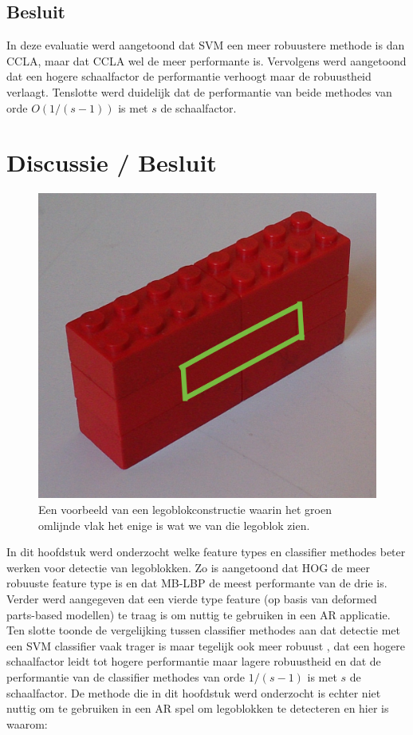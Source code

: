 \subsection{Besluit}
In deze evaluatie werd aangetoond dat SVM een meer robuustere methode is dan CCLA, maar dat CCLA wel de meer performante is. Vervolgens werd aangetoond dat een hogere schaalfactor de performantie verhoogt maar de robuustheid verlaagt. Tenslotte werd duidelijk dat de performantie van beide methodes van orde $O(1/(s-1))$ is met $s$ de schaalfactor.


\section{Discussie / Besluit} \label{sec:besl_hfdst4}

\begin{figure}
  \centering
  \includegraphics[width=0.5\linewidth]{img/brickWall}
  \caption{Een voorbeeld van een legoblokconstructie waarin het groen omlijnde vlak het enige is wat we van die legoblok zien.}
  \label{fig:brickWall}
\end{figure}

In dit hoofdstuk werd onderzocht welke feature types en classifier methodes beter werken voor detectie van legoblokken. Zo is aangetoond dat HOG de meer robuuste feature type is en dat MB-LBP de meest performante van de drie is. Verder werd aangegeven dat een vierde type feature (op basis van deformed parts-based modellen) te traag is om nuttig te gebruiken in een AR applicatie. Ten slotte toonde de vergelijking tussen classifier methodes aan dat detectie met een SVM classifier vaak trager is maar tegelijk ook meer robuust , dat een hogere schaalfactor leidt tot hogere performantie maar lagere robuustheid en dat de performantie van de classifier methodes van orde $1/(s-1)$ is met $s$ de schaalfactor. De methode die in dit hoofdstuk werd onderzocht is echter niet nuttig om te gebruiken in een AR spel om legoblokken te detecteren en hier is waarom:

